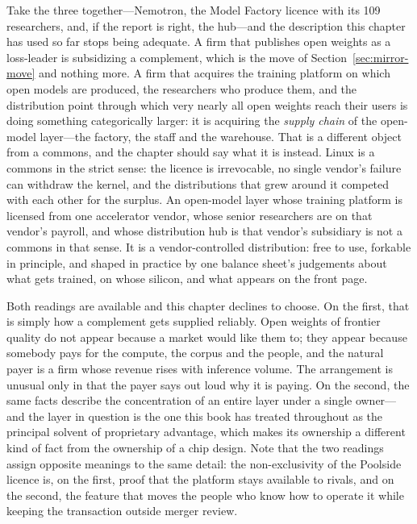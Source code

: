 Take the three together---Nemotron, the Model Factory licence with its 109 researchers, and, if the report is right, the hub---and the description this chapter has used so far stops being adequate. A firm that publishes open weights as a loss-leader is subsidizing a complement, which is the move of Section~\ref{sec:mirror-move} and nothing more. A firm that acquires the training platform on which open models are produced, the researchers who produce them, and the distribution point through which very nearly all open weights reach their users is doing something categorically larger: it is acquiring the \emph{supply chain} of the open-model layer---the factory, the staff and the warehouse. That is a different object from a commons, and the chapter should say what it is instead. Linux is a commons in the strict sense: the licence is irrevocable, no single vendor's failure can withdraw the kernel, and the distributions that grew around it competed with each other for the surplus. An open-model layer whose training platform is licensed from one accelerator vendor, whose senior researchers are on that vendor's payroll, and whose distribution hub is that vendor's subsidiary is not a commons in that sense. It is a vendor-controlled distribution: free to use, forkable in principle, and shaped in practice by one balance sheet's judgements about what gets trained, on whose silicon, and what appears on the front page.

Both readings are available and this chapter declines to choose. On the first, that is simply how a complement gets supplied reliably. Open weights of frontier quality do not appear because a market would like them to; they appear because somebody pays for the compute, the corpus and the people, and the natural payer is a firm whose revenue rises with inference volume. The arrangement is unusual only in that the payer says out loud why it is paying. On the second, the same facts describe the concentration of an entire layer under a single owner---and the layer in question is the one this book has treated throughout as the principal solvent of proprietary advantage, which makes its ownership a different kind of fact from the ownership of a chip design. Note that the two readings assign opposite meanings to the same detail: the non-exclusivity of the Poolside licence is, on the first, proof that the platform stays available to rivals, and on the second, the feature that moves the people who know how to operate it while keeping the transaction outside merger review.

